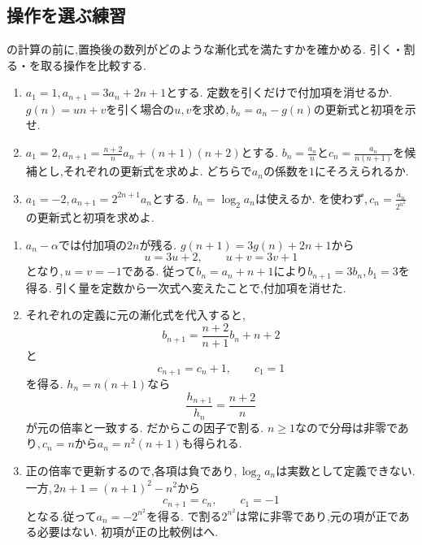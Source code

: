 \subsection{操作を選ぶ練習}\label{節：操作を選ぶ練習}
  の計算の前に,置換後の数列がどのような漸化式を満たすかを確かめる.
  引く・割る・を取る操作を比較する.

  \noindent{}\par\nobreak
  \begin{enumerate}[format=\bookitemlink{operation-choice}{problem}{answer}]
    \item $a_1=1$,\,$a_{n+1}=3a_n+2n+1$とする.
          定数を引くだけで付加項を消せるか.
          $g(n)=un+v$を引く場合の$u,v$を求め,\,$b_n=a_n-g(n)$の更新式と初項を示せ.
    \item $a_1=2$,\,$a_{n+1}=\frac{n+2}{n}a_n+(n+1)(n+2)$とする.
          $b_n=\frac{a_n}{n}$と$c_n=\frac{a_n}{n(n+1)}$を候補とし,それぞれの更新式を求めよ.
          どちらで$a_n$の係数を$1$にそろえられるか.
    \item $a_1=-2$,\,$a_{n+1}=2^{2n+1}a_n$とする.
          $b_n=\log_2a_n$は使えるか.
          を使わず,\,$c_n=\frac{a_n}{2^{n^2}}$の更新式と初項を求めよ.
  \end{enumerate}

  \noindent{}\par\nobreak
  \begin{enumerate}[format=\bookitemlink{operation-choice}{answer}{problem}]
    \item $a_n-\alpha$では付加項の$2n$が残る.
          $g(n+1)=3g(n)+2n+1$から
          \[
            u=3u+2,\qquad u+v=3v+1
          \]
          となり,\,$u=v=-1$である.
          従って$b_n=a_n+n+1$により$b_{n+1}=3b_n$,\,$b_1=3$を得る.
          引く量を定数から一次式へ変えたことで,付加項を消せた.

    \item それぞれの定義に元の漸化式を代入すると,
          \[
            b_{n+1}=\frac{n+2}{n+1}b_n+n+2
          \]
          と
          \[
            c_{n+1}=c_n+1,\qquad c_1=1
          \]
          を得る.
          $h_n=n(n+1)$なら
          \[
            \frac{h_{n+1}}{h_n}=\frac{n+2}{n}
          \]
          が元の倍率と一致する.
          だからこの因子で割る.
          $n\ge1$なので分母は非零であり,\,$c_n=n$から$a_n=n^2(n+1)$も得られる.

    \item 正の倍率で更新するので,各項は負であり,\,$\log_2a_n$は実数として定義できない.
          一方,\,$2n+1=(n+1)^2-n^2$から
          \[
            c_{n+1}=c_n,\qquad c_1=-1
          \]
          となる.従って$a_n=-2^{n^2}$を得る.
          で割る$2^{n^2}$は常に非零であり,元の項が正である必要はない.
          初項が正の比較例はへ.
  \end{enumerate}

